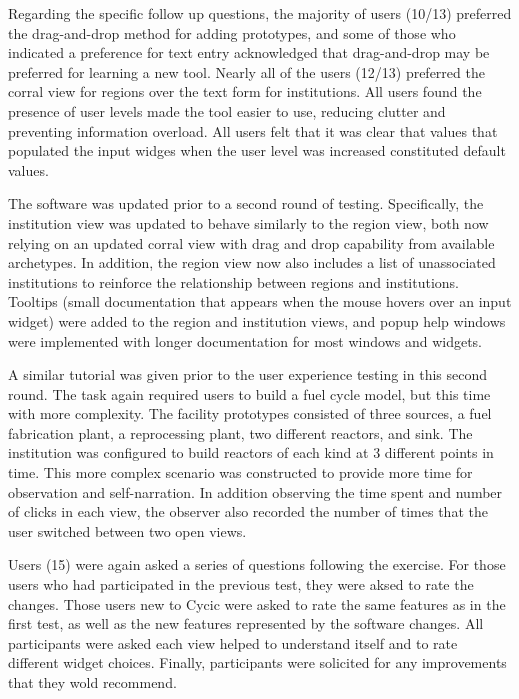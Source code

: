 Regarding the specific follow up questions, the majority of users (10/13)
preferred the drag-and-drop method for adding prototypes, and some of those
who indicated a preference for text entry acknowledged that drag-and-drop may
be preferred for learning a new tool.  Nearly all of the users (12/13)
preferred the corral view for regions over the text form for institutions.
All users found the presence of user levels made the tool easier to use,
reducing clutter and preventing information overload.  All users felt that it
was clear that values that populated the input widges when the user level was
increased constituted default values.

The software was updated prior to a second round of testing.  Specifically,
the institution view was updated to behave similarly to the region view, both
now relying on an updated corral view with drag and drop capability from
available archetypes.  In addition, the region view now also includes a list
of unassociated institutions to reinforce the relationship between regions and
institutions.  Tooltips (small documentation that appears when the mouse
hovers over an input widget) were added to the region and institution views,
and popup help windows were implemented with longer documentation for most
windows and widgets.

A similar tutorial was given prior to the user experience testing in this
second round.  The task again required users to build a fuel cycle model, but
this time with more complexity.  The facility prototypes consisted of three
sources, a fuel fabrication plant, a reprocessing plant, two different
reactors, and sink.  The institution was configured to build reactors of each
kind at 3 different points in time.  This more complex scenario was
constructed to provide more time for observation and self-narration.  In
addition observing the time spent and number of clicks in each view, the
observer also recorded the number of times that the user switched between two
open views.

Users (15) were again asked a series of questions following the exercise.  For
those users who had participated in the previous test, they were aksed to rate
the changes.  Those users new to Cycic were asked to rate the same features as
in the first test, as well as the new features represented by the software
changes.  All participants were asked each view helped to understand \Cyclus
itself and to rate different widget choices.  Finally, participants were
solicited for any improvements that they wold recommend.

